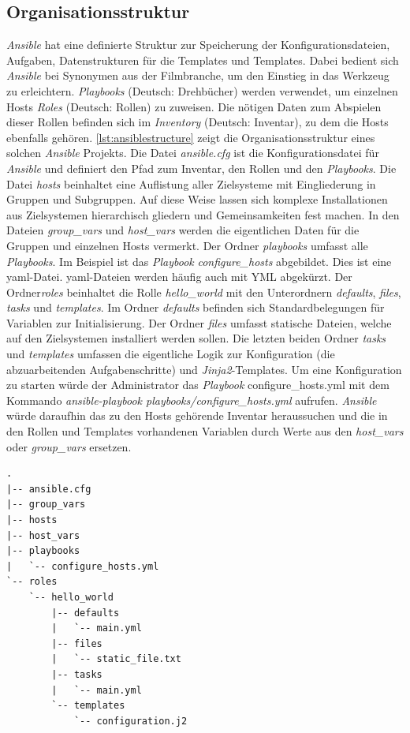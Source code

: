 \documentclass[titlepage]{report}
\begin{document}
\subsection*{Organisationsstruktur}
\emph{Ansible} hat eine definierte Struktur zur Speicherung der
Konfigurationsdateien, Aufgaben, Datenstrukturen für die Templates und
Templates. Dabei bedient sich \emph{Ansible} bei Synonymen aus der
Filmbranche, um den Einstieg in das Werkzeug zu erleichtern.
\emph{Playbooks} (Deutsch: Drehbücher) werden verwendet, um einzelnen
Hosts \emph{Roles} (Deutsch: Rollen) zu zuweisen. Die nötigen Daten zum
Abspielen dieser Rollen befinden sich im \emph{Inventory} (Deutsch:
Inventar), zu dem die Hosts ebenfalls gehören. 
\autoref{lst:ansiblestructure} zeigt die Organisationsstruktur eines
solchen \emph{Ansible} Projekts. Die Datei \emph{ansible.cfg} ist die
Konfigurationsdatei für \emph{Ansible} und definiert den Pfad zum
Inventar, den Rollen und den \emph{Playbooks}. Die Datei \emph{hosts}
beinhaltet eine Auflistung aller Zielsysteme mit Eingliederung in
Gruppen und Subgruppen. Auf diese Weise lassen sich komplexe
Installationen aus Zielsystemen hierarchisch gliedern und
Gemeinsamkeiten fest machen. In den Dateien \emph{group\_vars} und
\emph{host\_vars} werden die eigentlichen Daten für die Gruppen und
einzelnen Hosts vermerkt. Der Ordner \emph{playbooks} umfasst alle
\emph{Playbooks}. Im Beispiel ist das \emph{Playbook}
\emph{configure\_hosts} abgebildet. Dies ist eine \gls{yaml}\hyp{}Datei.
\gls{yaml}\hyp{}Dateien werden häufig auch mit YML abgekürzt. Der
Ordner\emph{roles} beinhaltet die Rolle \emph{hello\_world} mit den
Unterordnern \emph{defaults}, \emph{files}, \emph{tasks} und
\emph{templates}. Im Ordner \emph{defaults} befinden sich
Standardbelegungen für Variablen zur Initialisierung. Der Ordner
\emph{files} umfasst statische Dateien, welche auf den Zielsystemen
installiert werden sollen. Die letzten beiden Ordner \emph{tasks} und
\emph{templates} umfassen die eigentliche Logik zur Konfiguration (die
abzuarbeitenden Aufgabenschritte) und \emph{Jinja2}\hyp{}Templates. Um
eine Konfiguration zu starten würde der Administrator das
\emph{Playbook} {configure\_hosts.yml} mit dem Kommando
\emph{ansible-playbook playbooks/configure\_hosts.yml} aufrufen.
\emph{Ansible} würde daraufhin das zu den Hosts gehörende Inventar
heraussuchen und die in den Rollen und Templates vorhandenen Variablen
durch Werte aus den \emph{host\_vars} oder \emph{group\_vars} ersetzen.
\begin{minipage}{\linewidth}
\begin{lstlisting}[caption={Organisationsstruktur eines Ansible
Projekts},label={lst:ansiblestructure}]
.
|-- ansible.cfg
|-- group_vars
|-- hosts
|-- host_vars
|-- playbooks
|   `-- configure_hosts.yml
`-- roles
    `-- hello_world
        |-- defaults
        |   `-- main.yml
        |-- files
        |   `-- static_file.txt
        |-- tasks
        |   `-- main.yml
        `-- templates
            `-- configuration.j2
\end{lstlisting}
\end{minipage}
\end{document}
